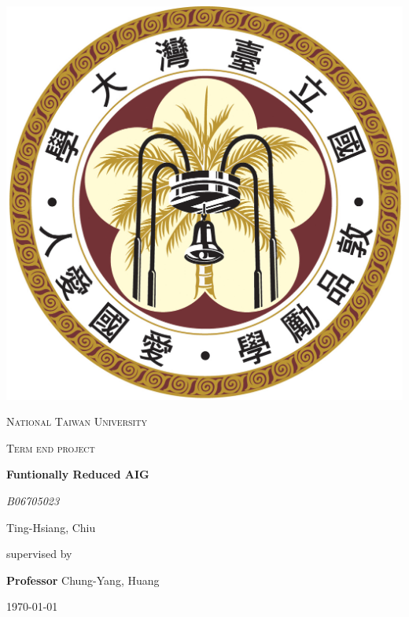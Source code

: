 \documentclass[12pt,a4paper]{report}
\begin{document}
\begin{titlepage}
  \centering
  \includegraphics[scale=0.45]{Emblem72.jpg}\par
  {\scshape\LARGE National Taiwan University \par}
  \vspace{1cm}
  {\scshape\Large Term end project\par}
  \vspace{1.5cm}
  {\huge\bfseries Funtionally Reduced AIG\par}
  \vspace{2cm}
  {\Large\itshape B06705023\par Ting-Hsiang, Chiu}
  \vfill
  supervised by\par
  \textbf{Professor }Chung-Yang, Huang

  \vfill

  {\large \today\par}
\end{titlepage}
\end{document}
